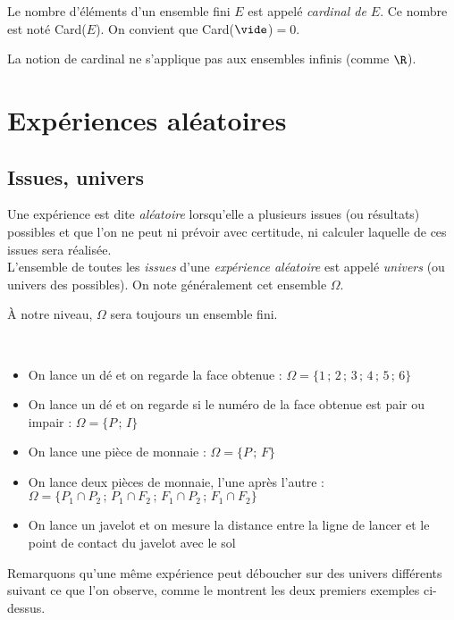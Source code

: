 \begin{definition}[Cardinal]
Le nombre d'\'el\'ements d'un ensemble fini $E$ est appel\'e \emph{cardinal de $E$}. Ce nombre est not\'e Card($E$).
On convient que Card($\vide$)$ = 0$.
\end{definition}

\begin{rmq} La notion de cardinal ne s'applique pas aux ensembles infinis (comme $\R$).\end{rmq}

\section{Exp\'eriences al\'eatoires}

\subsection{Issues, univers}

\begin{definition}
Une exp\'erience est dite \emph{al\'eatoire} lorsqu'elle a plusieurs issues (ou r\'esultats) possibles et que l'on ne peut ni pr\'evoir avec certitude, ni calculer laquelle de ces issues sera r\'ealis\'ee.\\L'ensemble de toutes les \emph{issues} d'une \emph{exp\'erience al\'eatoire} est appel\'e \emph{univers} (ou univers des possibles). On note
g\'en\'eralement cet ensemble $\Omega$.
\end{definition}

À notre niveau, $\Omega$ sera toujours un ensemble fini.

\begin{exemples*}~
\begin{itemize}
	\item On lance un d\'e et on regarde la face obtenue : $\Omega = \{1\,;\,2\,;\,3\,;\,4\,;\,5\,;\,6\}$
	\item On lance un d\'e et on regarde si le num\'ero de la face obtenue est pair ou impair : $\Omega = \{P\,;\,I\}$
	\item On lance une pi\`ece de monnaie : $\Omega = \{P\,;\,F\}$
	\item On lance deux pi\`eces de monnaie, l'une apr\`es l'autre : $\Omega = \{P_1\cap P_2\,;\,P_1\cap F_2\,;\,F_1\cap P_2\,;\,F_1\cap F_2\}$
	\item On lance un javelot et on mesure la distance entre la ligne de lancer et le point de contact du javelot avec le sol
\end{itemize}
\end{exemples*}
Remarquons qu'une même exp\'erience peut d\'eboucher sur des univers diff\'erents suivant ce que l'on observe, comme le montrent les deux premiers exemples ci-dessus.

